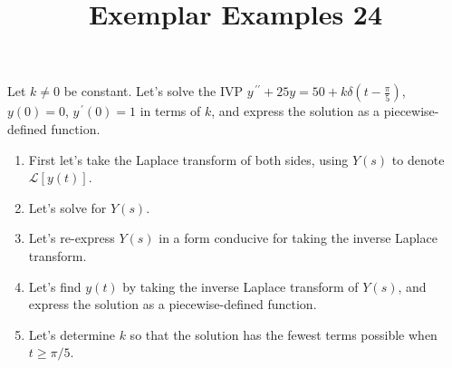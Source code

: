 \documentclass{ximera}
\begin{document}
\begin{abstract}
 \end{abstract}

    \title{Exemplar Examples 24}
    
    \maketitle

Let $k\neq 0$ be constant.  Let's solve the IVP $y^{\,\prime\prime}+25y=50+k\delta \left(t-\frac{\pi}{5}\right)$, $y(0)=0$, $y^{\,\prime}(0)=1$ in terms of $k$, and express the solution as a piecewise-defined function.

\begin{enumerate}
\item First let's take the Laplace transform of both sides, using $Y(s)$ to denote $\mathcal{L}{[y(t)]}$.

\vfill


\item  Let's solve for $Y(s)$.

\vfill

\item Let's re-express $Y(s)$ in a form conducive for taking the inverse Laplace transform.


\vfill

\newpage

\item  Let's find $y(t)$ by taking the inverse Laplace transform of $Y(s)$, and express the solution as a piecewise-defined function.


\vfill
\vfill
\vfill
\vfill

\item Let's determine $k$ so that the solution has the fewest terms possible when $t\geq \pi/5$.

\vfill

\end{enumerate}


\end{document}
